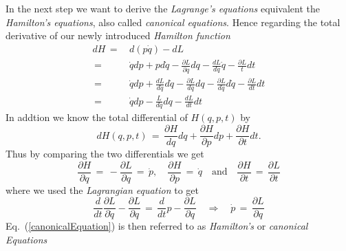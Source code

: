 In the next step we want to derive the \textit{Lagrange's equations} equivalent
the \textit{Hamilton's equations}, also called \textit{canonical equations}.
Hence regarding the total derivative of our newly introduced \textit{Hamilton
function}
\begin{equation}
  \begin{aligned}
    dH \,=\,& d(p \dot q) - dL \\
    \,=\,& \dot q dp + p d \dot q - \frac{\partial L}{\partial q} dq - \frac{d
L}{d \dot q} \dot q - \frac{\partial L}{t} dt \\
    \,=\,& \dot q dp + \frac{d L}{d \dot q} d \dot q - \frac{\partial L}{d q}
dq - \frac{\partial L}{d \dot q} d \dot q - \frac{\partial L}{dt} dt \\
    \,=\,& \dot q dp - \frac{L}{d q} dq - \frac{d L}{dt } dt
  \end{aligned}
\end{equation}
In addtion we know the total differential of $H(q, p, t)$ by
\begin{equation}
  d H(q, p, t) \,=\, \frac{\partial H}{d q} dq + \frac{\partial H}{\partial p}
dp + \frac{\partial H}{\partial t} dt.
\end{equation}
Thus by comparing the two differentials we get
\begin{equation}
  \label{canonicalEquation}
  \frac{\partial H}{\partial q} \,=\, - \frac{\partial L}{\partial q} \,=\,
\dot p, \quad \frac{\partial H}{\partial p} \,=\, \dot q \quad \text{and} \quad
\frac{\partial H}{\partial t} \,=\, \frac{\partial L}{\partial t}
\end{equation}
where we used the \textit{Lagrangian equation} to get
\begin{equation}
  \frac{d}{dt} \frac{\partial L}{\partial \dot q} - \frac{\partial L}{\partial
q} \,=\, \frac{d}{dt} p - \frac{\partial L}{\partial q} \quad \Rightarrow \quad
\dot p \,=\, \frac{\partial L}{\partial q}
\end{equation}
Eq.~(\ref{canonicalEquation}) is then referred to as \textit{Hamilton's} or
\textit{canonical Equations}

